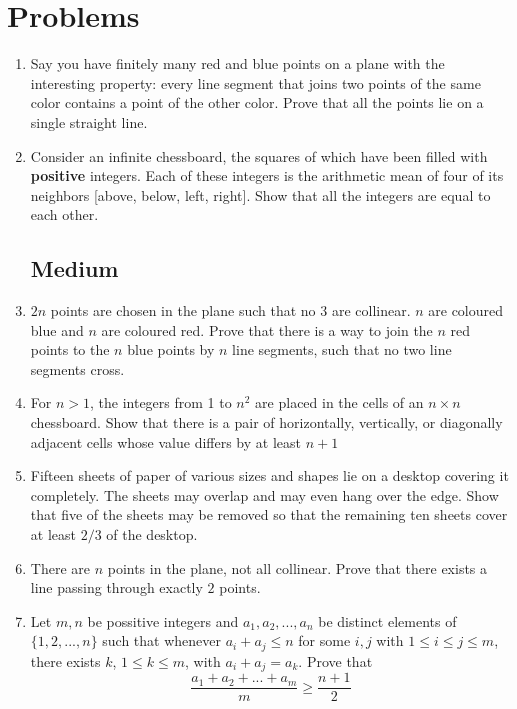 \documentclass[12pt]{article}
\begin{document}
\section{Problems}

\begin{enumerate}
	\subsection*{Easy}
	\item{Say you have finitely many red and blue points on a plane with the interesting property: every line segment that joins two points of the same color contains a point of the other color. Prove that all the points lie on a single straight line.}
	
	\item{Consider an infinite chessboard, the squares of which have been filled with \textbf{positive} integers. Each of these integers is the arithmetic mean of four of its neighbors [above, below, left, right]. Show that all the integers are equal to each other.}
	
	\subsection*{Medium}
	\item{$2n$ points are chosen in the plane such that no $3$ are collinear. $n$ are coloured blue and $n$ are coloured red. Prove that there is a way to join the $n$ red points to the $n$ blue points by $n$ line segments, such that no two line segments cross.}
	
	\item{For $n>1$, the integers from 1 to $n^2$ are placed in the cells of an $n\times n$ chessboard. Show that there is a pair of horizontally, vertically, or diagonally adjacent cells whose value differs by at least $n+1$}
	
	\item{Fifteen sheets of paper of various sizes and shapes lie on a desktop covering it completely. The sheets may overlap and may even hang over the edge. Show that five of the sheets may be removed so that the remaining ten sheets cover at least $2/3$ of the desktop.}
	
	\item{There are $n$ points in the plane, not all collinear. Prove that there exists a line passing through exactly $2$ points.}
	
	\item{Let $m, n$ be possitive integers and $a_1, a_2, ..., a_n$ be distinct elements of $\{1, 2, ..., n\}$ such that whenever $a_i + a_j \le n$ for some $i, j$ with $1\le i\le j\le m$, there exists $k$, $1 \le k \le m$, with $a_i + a_j = a_k$. Prove that
	\[\dfrac{a_1 + a_2 + ... + a_m}{m} \ge \dfrac{n+1}{2}\]}


\end{enumerate}
\end{document}
